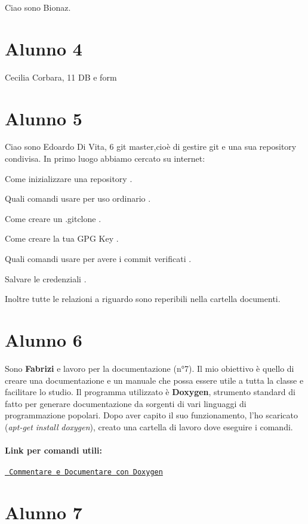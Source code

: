 Ciao sono Bionaz. \section*{Alunno 4}

Cecilia Corbara, 11 DB e form \section*{Alunno 5}

Ciao sono Edoardo Di Vita, 6 git master,cioè di gestire git e una sua repository condivisa. In primo luogo abbiamo cercato su internet\+:

Come inizializzare una repository .

Quali comandi usare per uso ordinario .

Come creare un .gitclone .

Come creare la tua G\+PG Key .

Quali comandi usare per avere i commit verificati .

Salvare le credenziali .

Inoltre tutte le relazioni a riguardo sono reperibili nella cartella documenti. \section*{Alunno 6}

Sono {\bfseries{Fabrizi}} e lavoro per la documentazione (n°7). Il mio obiettivo è quello di creare una documentazione e un manuale che possa essere utile a tutta la classe e facilitare lo studio. Il programma utilizzato è {\bfseries{Doxygen}}, strumento standard di fatto per generare documentazione da sorgenti di vari linguaggi di programmazione popolari. Dopo aver capito il suo funzionamento, l’ho scaricato ({\itshape apt-\/get} {\itshape install} {\itshape doxygen}), creato una cartella di lavoro dove eseguire i comandi.

\paragraph*{Link per comandi utili\+:}

\href{http://www.lotar.altervista.org/wiki/programming/php-and-doxygen}{\texttt{ Commentare e Documentare con Doxygen}} \section*{Alunno 7}

